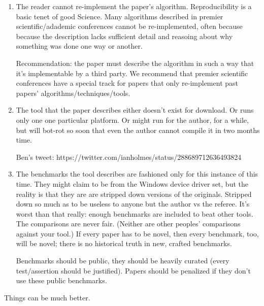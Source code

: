 \documentclass[conference]{IEEEtran}
\begin{document}
\begin{enumerate}

\item The reader cannot re-implement the paper's
  algorithm. Reproducibility is a basic tenet of good Science. Many
  algorithms described in premier scientific/adademic conferences
  cannot be re-implemented, often because because the description
  lacks sufficient detail and reasoing about why something was done
  one way or another.

  Recommendation: the paper must describe the algorithm in such a way
  that it's implementable by a third party. We recommend that premier
  scientific conferences have a special track for papers that
  only re-implement past papers' algorithms/techniques/tools. 


\item The tool that the paper describes either doesn't exist for
  download. Or runs only one one particular platform. Or might run for
  the author, for a while, but will bot-rot so soon that even the
  author cannot compile it in two months time.

  Ben's tweet: https://twitter.com/ianholmes/status/288689712636493824

\item The benchmarks the tool describes are fashioned only for this
  instance of this time. They might claim to be from the Windows
  device driver set, but the reality is that they are are stripped
  down versions of the originals. Stripped down so much as to be
  useless to anyone but the author vs the referee. It's worst than
  that really: enough benchmarks are included to beat other tools. The
  comparisons are never fair. (Neither are other peoples' comparisons
  against your tool.) If every paper has to be novel, then every
  benchmark, too, will be novel; there is no historical truth in new,
  crafted benchmarks.


  Benchmarks should be public, they should be heavily curated (every
  test/assertion should be justified). Papers should be penalized if
  they don't use these public benchmarks.

\end{enumerate}

Things can be much better. 
\end{document}
